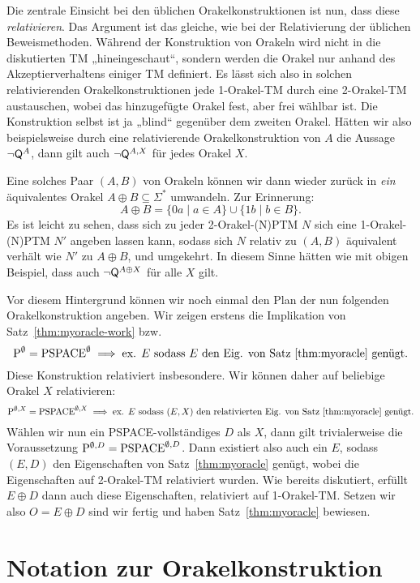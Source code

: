 Die zentrale Einsicht bei den üblichen Orakelkonstruktionen ist nun, dass diese \emph{relativieren}.
Das Argument ist das gleiche, wie bei der Relativierung der üblichen Beweismethoden. Während der Konstruktion von Orakeln wird nicht in die diskutierten TM „hineingeschaut“, sondern werden die Orakel nur anhand des Akzeptierverhaltens einiger TM definiert.
Es lässt sich also in solchen relativierenden Orakelkonstruktionen jede 1-Orakel-TM durch eine 2-Orakel-TM austauschen, wobei das hinzugefügte Orakel fest, aber frei wählbar ist. Die Konstruktion selbst ist ja „blind“ gegenüber dem zweiten Orakel.
Hätten wir also beispielsweise durch eine relativierende Orakelkonstruktion von $A$ die Aussage $\neg\hQ^A$, dann gilt auch $\neg\hQ^{A,X}$ für jedes Orakel $X$.

Eine solches Paar $(A,B)$ von Orakeln können wir dann wieder zurück in \emph{ein} äquivalentes Orakel $A\oplus B\subseteq\Sigma^*$ umwandeln. Zur Erinnerung:
\[ A\oplus B = \{0a\mid a\in A\} \cup \{1b\mid b\in B\}. \]
Es ist leicht zu sehen, dass sich zu jeder 2-Orakel-(N)PTM $N$ sich eine 1-Orakel-(N)PTM $N'$ angeben lassen kann, sodass sich $N$ relativ zu $(A,B)$ äquivalent verhält wie $N'$ zu $A\oplus B$, und umgekehrt.
In diesem Sinne hätten wie mit obigen Beispiel, dass auch $\neg\hQ^{A\oplus X}$ für alle $X$ gilt.

Vor diesem Hintergrund können wir noch einmal den Plan der nun folgenden Orakelkonstruktion angeben.
Wir zeigen erstens die Implikation von Satz~\ref{thm:myoracle-work} bzw.
\[  \P^\emptyset =\mathrm{PSPACE}^\emptyset \implies \text{ex. $E$ sodass $E$ den Eig. von Satz~\ref{thm:myoracle} genügt.}  \]
Diese Konstruktion relativiert insbesondere. Wir können daher auf beliebige Orakel $X$ relativieren:
\[  \P^{\emptyset,X} =\mathrm{PSPACE}^{\emptyset,X} \implies \text{ex. $E$ sodass $(E, X)$ den relativierten Eig. von Satz~\ref{thm:myoracle} genügt.}  \]
Wählen wir nun ein PSPACE-vollständiges $D$ als $X$, dann gilt trivialerweise die Voraussetzung $\P^{\emptyset,D}=\PSPACE^{\emptyset,D}$. Dann existiert also auch ein $E$, sodass $(E,D)$ den Eigenschaften von Satz~\ref{thm:myoracle} genügt, wobei die Eigenschaften auf 2-Orakel-TM relativiert wurden.
Wie bereits diskutiert, erfüllt $E\oplus D$ dann auch diese Eigenschaften, relativiert auf 1-Orakel-TM.
Setzen wir also $O=E\oplus D$ sind wir fertig und haben Satz~\ref{thm:myoracle} bewiesen.







\section{Notation zur Orakelkonstruktion}\label{sec:oracle-notation}

